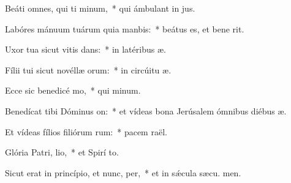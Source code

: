 \item Beáti omnes, qui ti minum,~* qui ámbulant in  jus.
\item Labóres mánuum tuárum quia manbis:~* beátus es, et bene  rit.
\item Uxor tua sicut vitis dans:~* in latéribus  æ.
\item Fílii tui sicut novéllæ orum:~* in circúitu  æ.
\item Ecce sic benedicé mo,~* qui  minum.
\item Benedícat tibi Dóminus  on:~* et vídeas bona Jerúsalem ómnibus diébus  æ.
\item Et vídeas fílios filiórum rum:~* pacem  raël.
\item Glória Patri,  lio,~* et Spirí to.
\item Sicut erat in princípio, et nunc,  per,~* et in sǽcula sæcu. men.
